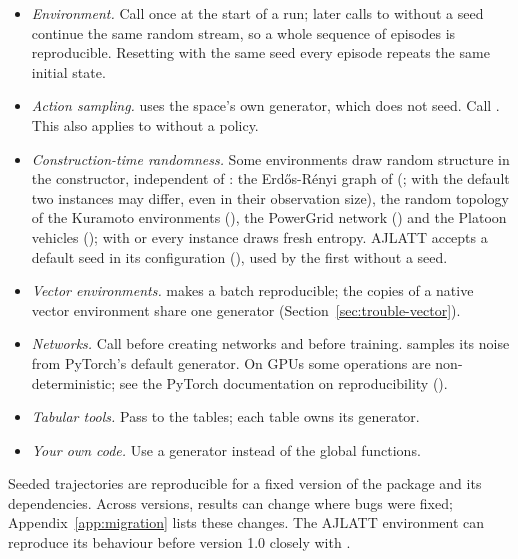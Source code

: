 \begin{itemize}
  \item \emph{Environment.} Call  once at the start of
    a run; later calls to  without a seed continue the same
    random stream, so a whole sequence of episodes is reproducible. Resetting
    with the same seed every episode repeats the same initial state.
  \item \emph{Action sampling.}  uses the
    space's own generator, which  does not seed. Call
    . This also applies to
     without a policy.
  \item \emph{Construction-time randomness.} Some environments draw random
    structure in the constructor, independent of : the
    Erd\H{o}s-R\'enyi graph of  (; with
    the default  two instances may differ, even in their
    observation size), the random topology of the Kuramoto environments
    (), the PowerGrid network
    () and the Platoon vehicles
    (); with  or
     every instance draws fresh entropy. AJLATT
    accepts a default seed in its configuration (), used by the
    first  without a seed.
  \item \emph{Vector environments.}  makes a batch
    reproducible; the copies of a native vector environment share one
    generator (Section~\ref{sec:trouble-vector}).
  \item \emph{Networks.} Call  before creating
    networks and before training.  samples its noise
    from PyTorch's default generator. On GPUs some operations are
    non-deterministic; see the PyTorch documentation on reproducibility
    ().
  \item \emph{Tabular tools.} Pass  to the tables; each table
    owns its generator.
  \item \emph{Your own code.} Use a 
    generator instead of the global  functions.
\end{itemize}

Seeded trajectories are reproducible for a fixed version of the package and
its dependencies. Across versions, results can change where bugs were fixed;
Appendix~\ref{app:migration} lists these changes. The AJLATT environment can
reproduce its behaviour before version 1.0 closely with
.

